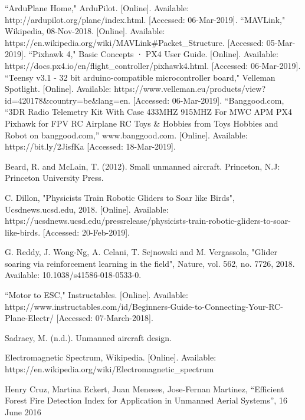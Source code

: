 \documentclass[12pt,journal,compsoc]{IEEEtran}
\begin{document}
\begin{thebibliography}{2}
``ArduPlane Home," ArduPilot. [Online]. Available: http://ardupilot.org/plane/index.html. [Accessed: 06-Mar-2019].
``MAVLink," Wikipedia, 08-Nov-2018. [Online]. Available: https://en.wikipedia.org/wiki/MAVLink\#Packet\_Structure. [Accessed: 05-Mar-2019].
``Pixhawk 4," Basic Concepts · PX4 User Guide. [Online]. Available: https://docs.px4.io/en/flight\_controller/pixhawk4.html. [Accessed: 06-Mar-2019].
``Teensy v3.1 - 32 bit arduino-compatible microcontroller board," Velleman Spotlight. [Online]. Available: 
https://www.velleman.eu/products/view\linebreak?id=420178\&country=be\&lang=en. [Accessed: 06-Mar-2019].
``Banggood.com, “3DR Radio Telemetry Kit With Case 433MHZ 915MHZ For MWC APM PX4 Pixhawk for FPV RC Airplane RC Toys \& Hobbies from Toys Hobbies and Robot on banggood.com,” www.banggood.com. [Online]. Available: https://bit.ly/2JisfKa [Accessed: 18-Mar-2019].

Beard, R. and McLain, T. (2012). Small unmanned aircraft. Princeton, N.J: Princeton University Press.

C. Dillon, "Physicists Train Robotic Gliders to Soar like Birds", Ucsdnews.ucsd.edu, 2018. [Online]. Available: https://ucsdnews.ucsd.edu/pressrelease/physicists-train-robotic-gliders-to-soar-like-birds. [Accessed: 20-Feb-2019].

G. Reddy, J. Wong-Ng, A. Celani, T. Sejnowski and M. Vergassola, "Glider soaring via reinforcement learning in the field", Nature, vol. 562, no. 7726, 2018. Available: 10.1038/s41586-018-0533-0.

``Motor to ESC," Instructables. [Online]. Available: https://www.instructables.com/id/Beginners-Guide-to-Connecting-Your-RC-Plane-Electr/ [Accessed: 07-March-2018].

Sadraey, M. (n.d.). Unmanned aircraft design.

Electromagnetic Spectrum, Wikipedia. [Online]. Available: 
https://en.wikipedia.org/wiki/Electromagnetic\_spectrum

Henry Cruz, Martina Eckert, Juan Meneses, Jose-Fernan Martinez, “Efficient Forest Fire Detection Index for Application in Unmanned Aerial Systems”, 16 June 2016


\end{thebibliography}
\end{document}
